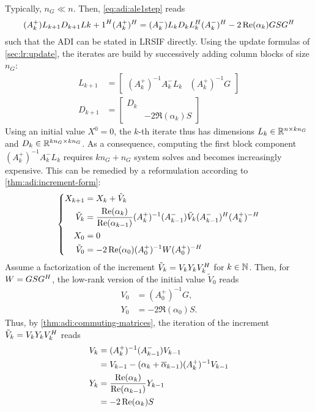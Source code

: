 Typically, $n_G \ll n$.
Then, \eqref{eq:adi:ale1step} reads
\begin{equation}
  (A_k^+) L_{k+1} D_{k+1} L{k+1}^H (A_k^+)^H
  = (A_k^-) L_k D_k L_k^H (A_k^-)^H - 2\operatorname{Re}(\alpha_k) GSG^H
\end{equation}
such that
the \ac{ADI} can be stated in \ac{LRSIF} directly.
Using the update formulas of \autoref{sec:lr:update},
the iterates are build by successively adding column blocks of size $n_G$:
\begin{align*}
  L_{k+1} &= \begin{bmatrix}
    (A^+_k)^{-1} A^-_k L_k &
    (A^+_k)^{-1} G
  \end{bmatrix} \\
  D_{k+1} &= \begin{bmatrix}
    D_k \\
    & -2\Re(\alpha_k) S
  \end{bmatrix}
\end{align*}
Using an initial value $X^0=0$,
the $k$-th iterate thus has dimensions $L_k \in\mathbb{R}^{n\times kn_G}$ and $D_k \in\mathbb{R}^{kn_G\times kn_G}$.
As a consequence, computing the first block component $(A_k^+)^{-1} A_k^- L_k$
requires $kn_G + n_G$ system solves and
becomes increasingly expensive.
This can be remedied by a reformulation according to \autoref{thm:adi:increment-form}:
\begin{equation*}
\left\{
\begin{aligned}
  X_{k+1}
    &= X_k + \tilde V_k \\
  \tilde V_k
    &= \frac{\operatorname{Re}(\alpha_k)}{\operatorname{Re}(\alpha_{k-1})}
      (A_k^+)^{-1} (A_{k-1}^-)
      \tilde V_k
      (A_{k-1}^-)^H (A_k^+)^{-H} \\
  X_0
    &= 0 \\
  \tilde V_0
    &= -2\operatorname{Re}(\alpha_0) (A_0^+)^{-1} W (A_0^+)^{-H}
\end{aligned}
\right.
\end{equation*}
Assume a factorization of the increment $\tilde V_k = V_k Y_k V_k^H$ for $k\in\mathbb{N}$.
Then, for $W = GSG^H$,
the low-rank version of the initial value $\tilde V_0$ reads
\begin{align*}
  V_0 &= (A_0^+)^{-1} G, \\
  Y_0 &= -2\Re(\alpha_0) S.
\end{align*}
Thus,
by \autoref{thm:adi:commuting-matrices},
the iteration of the increment $\tilde V_{k} = V_k Y_k V_k^H$ reads
\begin{align*}
  V_k &= (A_k^+)^{-1} (A_{k-1}^-) V_{k-1} \\
      &= V_{k-1} - (\alpha_k + \conj\alpha_{k-1}) (A_k^+)^{-1} V_{k-1} \\
  Y_k &= \frac{\Re(\alpha_k)}{\Re(\alpha_{k-1})} Y_{k-1} \\
      &= -2\Re(\alpha_k) S
\end{align*}
